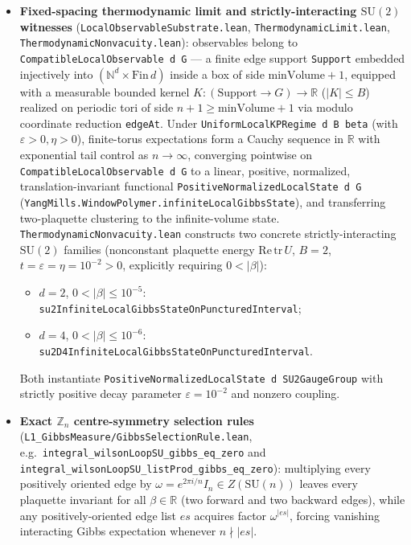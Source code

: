 \documentclass[11pt]{article}
\newcommand{\Z}{\mathbb{Z}}
\newcommand{\R}{\mathbb{R}}
\begin{document}
\begin{itemize}
  \item \textbf{Fixed-spacing thermodynamic limit and strictly-interacting $\mathrm{SU}(2)$ witnesses}
  (\texttt{LocalObservableSubstrate.lean}, \texttt{ThermodynamicLimit.lean},
  \texttt{ThermodynamicNonvacuity.lean}): observables belong to
  \texttt{CompatibleLocalObservable d G} — a finite edge support \texttt{Support} embedded
  injectively into $(\mathbb{N}^d \times \mathrm{Fin}\,d)$ inside a box of side
  $\mathrm{minVolume}+1$, equipped with a measurable bounded kernel
  $K : (\mathrm{Support} \to G) \to \R$ ($|K| \le B$) realized on periodic tori of side
  $n+1 \ge \mathrm{minVolume}+1$ via modulo coordinate reduction \texttt{edgeAt}. Under
  \texttt{UniformLocalKPRegime d B beta} (with $\varepsilon > 0, \eta > 0$), finite-torus
  expectations form a Cauchy sequence in $\R$ with exponential tail control as $n \to \infty$,
  converging pointwise on \texttt{CompatibleLocalObservable d G} to a linear, positive,
  normalized, translation-invariant functional \texttt{PositiveNormalizedLocalState d G}
  (\nolinkurl{YangMills.WindowPolymer.infiniteLocalGibbsState}), and transferring
  two-plaquette clustering to the infinite-volume state.
  \texttt{ThermodynamicNonvacuity.lean} constructs two concrete strictly-interacting
  $\mathrm{SU}(2)$ families (nonconstant plaquette energy $\mathrm{Re}\,\mathrm{tr}\,U$,
  $B = 2$, $t = \varepsilon = \eta = 10^{-2} > 0$, explicitly requiring $0 < |\beta|$):
  \begin{itemize}
    \item $d = 2$, $0 < |\beta| \le 10^{-5}$:
    \nolinkurl{su2InfiniteLocalGibbsStateOnPuncturedInterval};
    \item $d = 4$, $0 < |\beta| \le 10^{-6}$:
    \nolinkurl{su2D4InfiniteLocalGibbsStateOnPuncturedInterval}.
  \end{itemize}
  Both instantiate \texttt{PositiveNormalizedLocalState d SU2GaugeGroup} with strictly
  positive decay parameter $\varepsilon = 10^{-2}$ and nonzero coupling.

  \item \textbf{Exact $\Z_n$ centre-symmetry selection rules}
  (\texttt{L1\_GibbsMeasure/GibbsSelectionRule.lean}, e.g.\
  \nolinkurl{integral_wilsonLoopSU_gibbs_eq_zero} and
  \nolinkurl{integral_wilsonLoopSU_listProd_gibbs_eq_zero}): multiplying every positively
  oriented edge by $\omega = e^{2\pi i/n} I_n \in Z(\mathrm{SU}(n))$ leaves every plaquette
  invariant for all $\beta \in \R$ (two forward and two backward edges), while any
  positively-oriented edge list $es$ acquires factor $\omega^{|es|}$, forcing vanishing
  interacting Gibbs expectation whenever $n \nmid |es|$.
\end{itemize}
\end{document}
